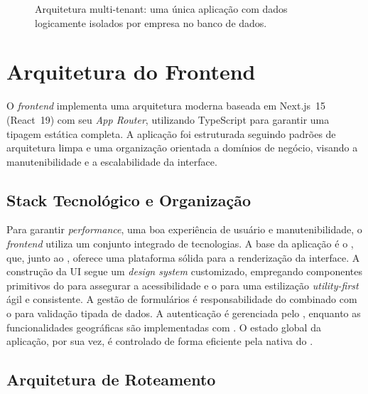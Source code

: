 \begin{figure}[H]
  \caption{Arquitetura multi-tenant: uma única aplicação com dados logicamente isolados por empresa no banco de dados.}
  \label{fig:arquitetura-multi-tenant}
\end{figure}

\section{Arquitetura do Frontend}

O \textit{frontend} implementa uma arquitetura moderna baseada em Next.js~15 (React~19) com seu \textit{App Router}, utilizando TypeScript para garantir uma tipagem estática completa. A aplicação foi estruturada seguindo padrões de arquitetura limpa e uma organização orientada a domínios de negócio, visando a manutenibilidade e a escalabilidade da interface.

\subsection{Stack Tecnológico e Organização}

Para garantir \textit{performance}, uma boa experiência de usuário e manutenibilidade, o \textit{frontend} utiliza um conjunto integrado de tecnologias. A base da aplicação é o , que, junto ao , oferece uma plataforma sólida para a renderização da interface. A construção da UI segue um \textit{design system} customizado, empregando componentes primitivos do  para assegurar a acessibilidade e o  para uma estilização \textit{utility-first} ágil e consistente. A gestão de formulários é responsabilidade do  combinado com o  para validação tipada de dados. A autenticação é gerenciada pelo , enquanto as funcionalidades geográficas são implementadas com . O estado global da aplicação, por sua vez, é controlado de forma eficiente pela  nativa do .

\subsection{Arquitetura de Roteamento}

